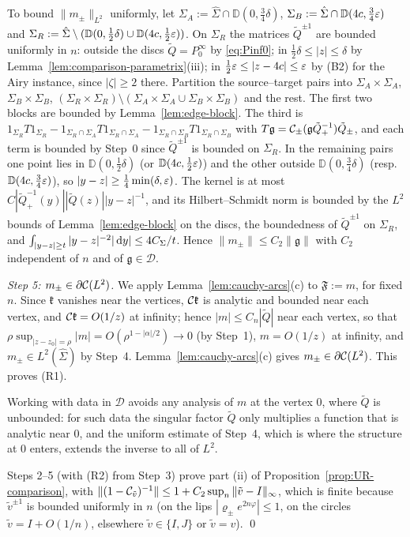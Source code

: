To bound $\|m_\pm\|_{L^2}$ uniformly, let $\Sigma_A:=\hat\Sigma\cap \mathbb D(0,\frac34\delta)$, $\Sigma_B:=\hat\Sigma\cap \mathbb D(4c,\frac34\varepsilon)$
and $\Sigma_R:=\hat\Sigma\setminus(\mathbb D(0,\frac12\delta)\cup \mathbb D(4c,\frac12\varepsilon))$. On $\Sigma_R$ the matrices $\tilde Q^{\pm1}$ are
bounded uniformly in $n$: outside the discs $\tilde Q=P^\infty_0$ by \eqref{eq:Pinf0}; in $\frac12\delta\le|z|\le\delta$ by
Lemma~\ref{lem:comparison-parametrix}(iii); in $\frac12\varepsilon\le|z-4c|\le\varepsilon$ by (B2) for the Airy instance, since
$|\zeta|\ge2$ there. Partition the source--target pairs into $\Sigma_A\times\Sigma_A$, $\Sigma_B\times\Sigma_B$,
$(\Sigma_R\times\Sigma_R)\setminus(\Sigma_A\times\Sigma_A\cup\Sigma_B\times\Sigma_B)$ and the rest. The first two blocks are bounded by
Lemma~\ref{lem:edge-block}. The third is $1_{\Sigma_R}T1_{\Sigma_R}-1_{\Sigma_R\cap\Sigma_A}T1_{\Sigma_R\cap\Sigma_A}-
1_{\Sigma_R\cap\Sigma_B}T1_{\Sigma_R\cap\Sigma_B}$ with $T\mathfrak g=\mathcal{C}_\pm(\mathfrak g\tilde Q_+^{-1})\tilde Q_\pm$, and each
term is bounded by Step~0 since $\tilde Q^{\pm1}$ is bounded on $\Sigma_R$. In the remaining pairs one point lies in
$\mathbb D(0,\frac12\delta)$ (or $\mathbb D(4c,\frac12\varepsilon)$) and the other outside $\mathbb D(0,\frac34\delta)$ (resp.\ $\mathbb D(4c,\frac34\varepsilon)$), so
$|y-z|\ge\frac14\min(\delta,\varepsilon)$. The kernel is at most $C|\tilde Q_+^{-1}(y)||\tilde Q(z)||y-z|^{-1}$, and its
Hilbert--Schmidt norm is bounded by the $L^2$ bounds of Lemma~\ref{lem:edge-block} on the discs, the boundedness of
$\tilde Q^{\pm1}$ on $\Sigma_R$, and $\int_{|y-z|\ge t}|y-z|^{-2}|\,\mathrm{d} y|\le4C_\Sigma/t$. Hence $\|m_\pm\|\le C_2\|\mathfrak g\|$ with
$C_2$ independent of $n$ and of $\mathfrak g\in\mathcal D$.

\emph{Step 5: $m_\pm\in\partial\mathcal{C}(L^2)$.} We apply Lemma~\ref{lem:cauchy-arcs}(c) to $\mathfrak F:=m$, for fixed $n$. Since $\mathfrak k$ vanishes
near the vertices, $\mathcal{C}\mathfrak k$ is analytic and bounded near each vertex, and $\mathcal{C}\mathfrak k=O(1/z)$ at infinity;
hence $|m|\le C_n|\tilde Q|$ near each vertex, so that $\rho\sup_{|z-z_0|=\rho}|m|=O(\rho^{1-|\alpha|/2})\to0$ (by Step~1),
$m=O(1/z)$ at infinity, and $m_\pm\in L^2(\hat\Sigma)$ by Step~4. Lemma~\ref{lem:cauchy-arcs}(c) gives $m_\pm\in\partial\mathcal{C}(L^2)$. This
proves (R1).

Working with data in $\mathcal D$ avoids any analysis of $m$ at the vertex $0$, where $\tilde Q$ is unbounded: for such
data the singular factor $\tilde Q$ only multiplies a function that is analytic near $0$, and the uniform estimate of
Step~4, which is where the structure at $0$ enters, extends the inverse to all of $L^2$.

Steps 2--5 (with (R2) from Step~3) prove part (ii) of Proposition~\ref{prop:UR-comparison}, with $\|(1-\mathcal{C}_{\tilde v})^{-1}\|\le1+C_2\sup_n\|\tilde v-I\|_\infty$,
which is finite because $\tilde v^{\pm1}$ is bounded uniformly in $n$ (on the lips $|\varrho_\pm e^{2n\varphi}|\le1$, on the circles
$\tilde v=I+O(1/n)$, elsewhere $\tilde v\in\{I,J\}$ or $\tilde v=v$). \qed

